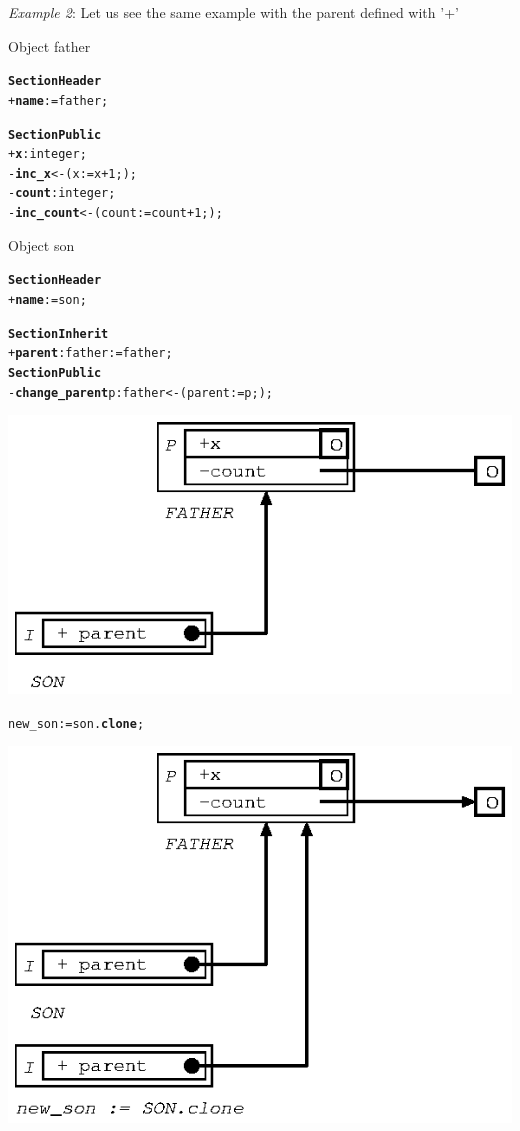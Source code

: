 \documentclass[11pt]{mybook}
\begin{document}
{\it{}Example 2}: Let us see the same example with the parent defined with '+'
\begin{center}
Object {\sc{}father}
\end{center}
\begin{alltt}
{\bf{}Section Header}
  + {\bf{}name}     := {\sc{}father};          

{\bf{}Section Public}
  + {\bf{}x}    :{\sc{}integer};
  - {\bf{}inc\_x} <- ( x := x + 1; );
  - {\bf{}count}:{\sc{}integer};
  - {\bf{}inc\_count} <- ( count := count + 1; );
\end{alltt}
\begin{center}
Object {\sc{}son}
\end{center}
\begin{alltt} 
{\bf{}Section Header}
  + {\bf{}name}     := {\sc{}son};          

{\bf{}Section Inherit}
  + {\bf{}parent}:{\sc{}father} := {\sc{}father};
{\bf{}Section Public}
  - {\bf{}change\_parent} p:{\sc{}father} <- ( parent := p; );
\end{alltt}
\begin{center}
\includegraphics[scale=1.0]{figures/inherit_plus_0}
\end{center}

\begin{alltt}
  new\_son := {\sc{}son}.{\bf{}clone};
\end{alltt}
\begin{center}
\includegraphics[scale=1.0]{figures/inherit_plus_1} 
\end{center}
\end{document}
